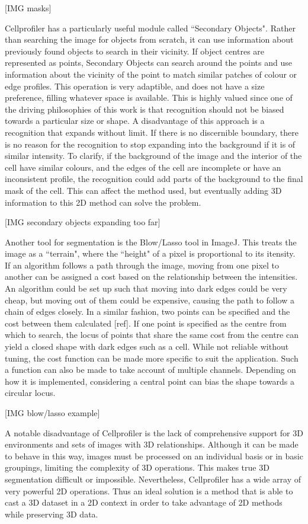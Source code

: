 [IMG masks]

Cellprofiler has a particularly useful module called ``Secondary Objects". Rather than searching the image for objects from scratch, it can use information about previously found objects to search in their vicinity. If object centres are represented as points, Secondary Objects can search around the points and use information about the vicinity of the point to match similar patches of colour or edge profiles. This operation is very adaptible, and does not have a size preference, filling whatever space is available. This is highly valued since one of the driving philosophies of this work is that recognition should not be biased towards a particular size or shape. A disadvantage of this approach is a recognition that expands without limit. If there is no discernible boundary, there is no reason for the recognition to stop expanding into the background if it is of similar intensity. To clarify, if the background of the image and the interior of the cell have similar colours, and the edges of the cell are incomplete or have an inconsistent profile, the recognition could add parts of the background to the final mask of the cell. This can affect the method used, but eventually adding 3D information to this 2D method can solve the problem.

[IMG secondary objects expanding too far]

Another tool for segmentation is the Blow/Lasso tool in ImageJ. This treats the image as a ``terrain", where the ``height" of a pixel is proportional to its itensity. If an algorithm follows a path through the image, moving from one pixel to another can be assigned a cost based on the relationship between the intensities. An algorithm could be set up such that moving into dark edges could be very cheap, but moving out of them could be expensive, causing the path to follow a chain of edges closely. In a similar fashion, two points can be specified and the cost between them calculated [ref]. If one point is specified as the centre from which to search, the locus of points that share the same cost from the centre can yield a closed shape with dark edges such as a cell. While not reliable without tuning, the cost function can be made more specific to suit the application. Such a function can also be made to take account of multiple channels. Depending on how it is implemented, considering a central point can bias the shape towards a circular locus.

[IMG blow/lasso example]

A notable disadvantage of Cellprofiler is the lack of comprehensive support for 3D environments and sets of images with 3D relationships. Although it can be made to behave in this way, images must be processed on an individual basis or in basic groupings, limiting the complexity of 3D operations. This makes true 3D segmentation difficult or impossible. Nevertheless, Cellprofiler has a wide array of very powerful 2D operations. Thus an ideal solution is a method that is able to cast a 3D dataset in a 2D context in order to take advantage of 2D methods while preserving 3D data.

